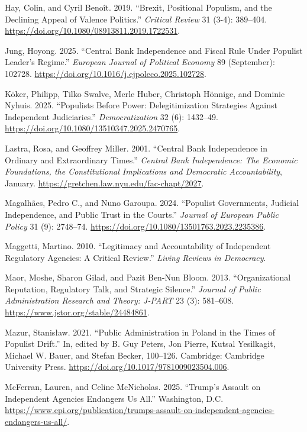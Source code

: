 \documentclass[
  11pt,
  letterpaper,
  DIV=11,
  numbers=noendperiod]{scrartcl}
\newlength{\cslhangindent}
\newenvironment{CSLReferences}[2] %
 {\begin{list}{}{%
  \setlength{\itemindent}{0pt}
  \setlength{\leftmargin}{0pt}
  \setlength{\parsep}{0pt}
  \ifodd #1
   \setlength{\leftmargin}{\cslhangindent}
   \setlength{\itemindent}{-1\cslhangindent}
  \fi
  \setlength{\itemsep}{#2\baselineskip}}}
 {\end{list}}
\begin{document}
\begin{CSLReferences}{1}{0}
Hay, Colin, and Cyril Benoît. 2019. {``Brexit, Positional Populism, and
the Declining Appeal of Valence Politics.''} \emph{Critical Review} 31
(3-4): 389--404. \url{https://doi.org/10.1080/08913811.2019.1722531}.

Jung, Hoyong. 2025. {``Central Bank Independence and Fiscal Rule Under
Populist Leader's Regime.''} \emph{European Journal of Political
Economy} 89 (September): 102728.
\url{https://doi.org/10.1016/j.ejpoleco.2025.102728}.

Köker, Philipp, Tilko Swalve, Merle Huber, Christoph Hönnige, and
Dominic Nyhuis. 2025. {``Populists Before Power: Delegitimization
Strategies Against Independent Judiciaries.''} \emph{Democratization} 32
(6): 1432--49. \url{https://doi.org/10.1080/13510347.2025.2470765}.

Lastra, Rosa, and Geoffrey Miller. 2001. {``Central Bank Independence in
Ordinary and Extraordinary Times.''} \emph{Central Bank Independence:
The Economic Foundations, the Constitutional Implications and Democratic
Accountability}, January.
\url{https://gretchen.law.nyu.edu/fac-chapt/2027}.

Magalhães, Pedro C., and Nuno Garoupa. 2024. {``Populist Governments,
Judicial Independence, and Public Trust in the Courts.''} \emph{Journal
of European Public Policy} 31 (9): 2748--74.
\url{https://doi.org/10.1080/13501763.2023.2235386}.

Maggetti, Martino. 2010. {``Legitimacy and Accountability of Independent
Regulatory Agencies: A Critical Review.''} \emph{Living Reviews in
Democracy}.

Maor, Moshe, Sharon Gilad, and Pazit Ben-Nun Bloom. 2013.
{``Organizational Reputation, Regulatory Talk, and Strategic Silence.''}
\emph{Journal of Public Administration Research and Theory: J-PART} 23
(3): 581--608. \url{https://www.jstor.org/stable/24484861}.

Mazur, Stanisław. 2021. {``Public Administration in Poland in the Times
of Populist Drift.''} In, edited by B. Guy Peters, Jon Pierre, Kutsal
Yesilkagit, Michael W. Bauer, and Stefan Becker, 100--126. Cambridge:
Cambridge University Press.
\url{https://doi.org/10.1017/9781009023504.006}.

McFerran, Lauren, and Celine McNicholas. 2025. {``Trump{'}s Assault on
Independent Agencies Endangers Us All.''} Washington, D.C.
\url{https://www.epi.org/publication/trumps-assault-on-independent-agencies-endangers-us-all/}.


\end{CSLReferences}
\end{document}
